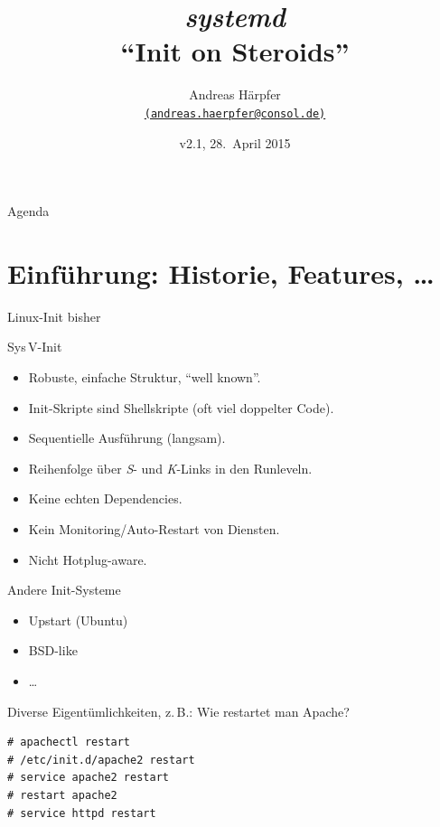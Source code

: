 
\title[systemd]{\emph{\huge systemd}\\[1ex] ``Init on Steroids''}
\author[Andreas Härpfer]{Andreas Härpfer \\
  {\scriptsize \href{mailto:andreas.haerpfer@consol.de}
   {\nolinkurl{(andreas.haerpfer@consol.de)}}}}
\date{v2.1, 28.~April 2015}

\subject{systemd}






\begin{frame}[plain]
\titlepage
\end{frame}

\begin{frame}{Agenda}
\tableofcontents
\end{frame}

\section[Einführung]{Einführung: Historie, Features, \dots}

\begin{frame}{Linux-Init bisher}
\begin{block}{Sys\,V-Init}
\begin{itemize}
\item Robuste, einfache Struktur, ``well known''.
\item Init-Skripte sind Shellskripte (oft viel doppelter Code).
\item Sequentielle Ausführung (langsam).
\item Reihenfolge über \emph{S}- und \emph{K}-Links in den Runleveln.
\item Keine echten Dependencies.
\item Kein Monitoring/Auto-Restart von Diensten.
\item Nicht Hotplug-aware.
\end{itemize}
\end{block}

\begin{block}{Andere Init-Systeme}
\begin{itemize}
\item Upstart (Ubuntu)
\item BSD-like
\item \dots
\end{itemize}
\end{block}

\framebreak
Diverse Eigentümlichkeiten, z.\,B.: Wie restartet man Apache?

\begin{lstlisting}[style=numbered]
# apachectl restart
# /etc/init.d/apache2 restart
# service apache2 restart
# restart apache2
# service httpd restart
\end{lstlisting}
\end{frame}



